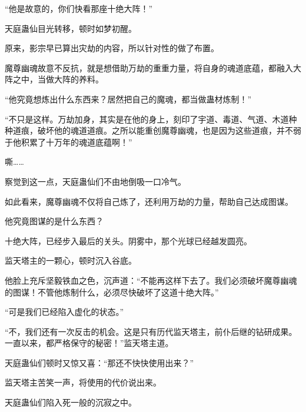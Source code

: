 \begin{this_body}
“他是故意的，你们快看那座十绝大阵！”

天庭蛊仙目光转移，顿时如梦初醒。

原来，影宗早已算出灾劫的内容，所以针对性的做了布置。

魔尊幽魂故意不反抗，就是想借助万劫的重重力量，将自身的魂道底蕴，都融入大阵之中，当做大阵的养料。

“他究竟想炼出什么东西来？居然把自己的魔魂，都当做蛊材炼制！”

“不只是这样。万劫加身，其实是在他的身上，刻印了宇道、毒道、气道、木道种种道痕，破坏他的魂道道痕。之所以能重创魔尊幽魂，也是因为这些道痕，并不弱于他积累了十万年的魂道底蕴啊！”

嘶……

察觉到这一点，天庭蛊仙们不由地倒吸一口冷气。

如此看来，魔尊幽魂不仅将自己炼了，还利用万劫的力量，帮助自己达成图谋。

他究竟图谋的是什么东西？

十绝大阵，已经步入最后的关头。阴雾中，那个光球已经越发圆亮。

监天塔主的一颗心，顿时沉入谷底。

他脸上充斥坚毅铁血之色，沉声道：“不能再这样下去了。我们必须破坏魔尊幽魂的图谋！不管他炼制什么，必须尽快破坏了这道十绝大阵。”

“可是我们已经陷入虚化的状态。”

“不，我们还有一次反击的机会。这是只有历代监天塔主，前仆后继的钻研成果。一直以来，都严格保守的秘密！”监天塔主道。

天庭蛊仙们顿时又惊又喜：“那还不快快使用出来？”

监天塔主苦笑一声，将使用的代价说出来。

天庭蛊仙们陷入死一般的沉寂之中。

\end{this_body}

